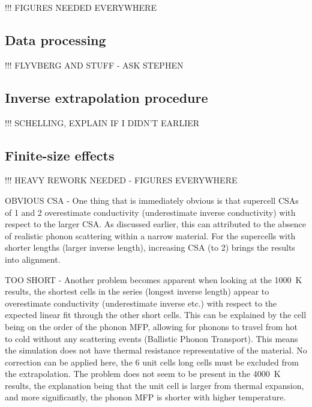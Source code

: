 !!! FIGURES NEEDED EVERYWHERE


\subsection{\label{sec:3.DM.data}Data processing}

!!! FLYVBERG AND STUFF - ASK STEPHEN


\subsection{\label{sec:3.DM.extrap}Inverse extrapolation procedure}

!!! SCHELLING, EXPLAIN IF I DIDN'T EARLIER


\subsection{\label{sec:3.DM.fse}Finite-size effects}

!!! HEAVY REWORK NEEDED - FIGURES EVERYWHERE

OBVIOUS CSA - One thing that is immediately obvious is that supercell CSAs of 1 and 2 overestimate conductivity (underestimate inverse conductivity) with respect to the larger CSA. As discussed earlier, this can attributed to the absence of realistic phonon scattering within a narrow material. For the supercells with shorter lengths (larger inverse length), increasing CSA (to 2) brings the results into alignment. 

TOO SHORT - Another problem becomes apparent when looking at the 1000~K results, the shortest cells in the series (longest inverse length) appear to overestimate conductivity (underestimate inverse etc.) with respect to the expected linear fit through the other short cells. This can be explained by the cell being on the order of the phonon MFP, allowing for phonons to travel from hot to cold without any scattering events (Ballistic Phonon Transport). This means the simulation does not have thermal resistance representative of the material. No correction can be applied here, the 6 unit cells long cells must be excluded from the extrapolation. The problem does not seem to be present in the 4000~K results, the explanation being that the unit cell is larger from thermal expansion, and more significantly, the phonon MFP is shorter with higher temperature.

